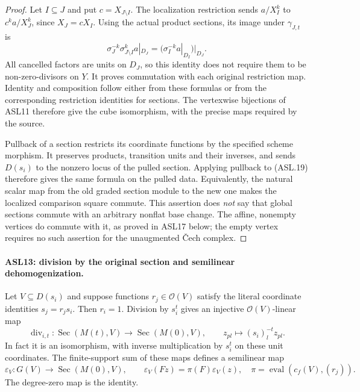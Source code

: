 \documentclass[11pt,a4paper]{article}
\numberwithin{equation}{section}
\theoremstyle{remark}\newtheorem{remark}[theorem]{Remark}
\begin{document}
\begin{proof}
Let $I\subseteq J$ and put $c=X_{J\setminus I}$.
The localization restriction sends
$a/X_I^k$ to $c^ka/X_J^k$, since $X_J=cX_I$.
Using the actual product sections, its image under $\gamma_{J,t}$
is
\[
 \sigma_J^{-k}\sigma_{J\setminus I}^{k}a|_{D_J}
       =\bigl(\sigma_I^{-k}a|_{D_I}\bigr)|_{D_J}.
                                                        \tag{ASL.21}
\]
All cancelled factors are units on $D_J$, so this identity
does not require them to be non-zero-divisors on $Y$.
It proves commutation with each original restriction map.
Identity and composition follow either from these formulas or
from the corresponding restriction identities for sections.
The vertexwise bijections of ASL11 therefore give the cube
isomorphism, with the precise maps required by the source.

Pullback of a section restricts its coordinate functions by the
specified scheme morphism.  It preserves products, transition
units and their inverses, and sends $D(s_i)$ to the nonzero
locus of the pulled section.  Applying pullback to (ASL.19)
therefore gives the same formula on the pulled data.  Equivalently,
the natural scalar map from the old graded section module to
the new one makes the localized comparison square commute.
This assertion does \emph{not} say that global sections commute
with an arbitrary nonflat base change.  The affine, nonempty
vertices do commute with it, as proved in ASL17 below; the
empty vertex requires no such assertion for the unaugmented
\v Cech complex.
\end{proof}

\paragraph{ASL13: division by the original section and semilinear dehomogenization.}
\label{claim:ASL13}
Let $V\subseteq D(s_i)$ and suppose functions
$r_j\in\mathcal O(V)$ satisfy the literal coordinate identities
$s_j=r_js_i$.  Then $r_i=1$.  Division by $s_i^t$ gives an
injective $\mathcal O(V)$-linear map
\[
 \operatorname{div}_{i,t}:\operatorname{Sec}(M(t),V)
                         \longrightarrow\operatorname{Sec}(M(0),V),
 \qquad z_{pl}\longmapsto(s_i)_l^{-t}z_{pl}.
                                                        \tag{ASL.22}
\]
In fact it is an isomorphism, with inverse multiplication by
$s_i^t$ on these unit coordinates.  The finite-support sum of
these maps defines a semilinear map
\[
 \varepsilon_V:G(V)\longrightarrow\operatorname{Sec}(M(0),V),
 \qquad \varepsilon_V(Fz)=\pi(F)\varepsilon_V(z),
 \quad \pi=\operatorname{eval}(c_f(V),(r_j)).        \tag{ASL.23}
\]
The degree-zero map is the identity.
\end{document}
